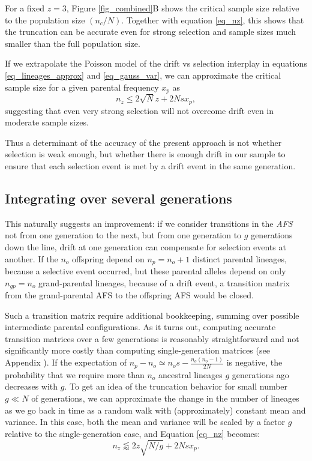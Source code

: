 \documentclass[9pt,twocolumn,twoside,lineno]{gsajnl}
\begin{document}
 For a fixed $z=3$, Figure \ref{fig_combined}B shows the critical sample size relative to the population size
 $(n_c/N)$. Together with equation \ref{eq_nz}, this shows
that the truncation can be accurate even for strong selection and sample sizes much smaller than
the full population size.

If we extrapolate the Poisson model of the drift vs selection interplay in equations \eqref{eq_lineages_approx} and \eqref{eq_gauss_var},
we can approximate the critical sample size for a given parental frequency $x_p$ as
\begin{equation*}
  n_z \leq 2 \sqrt{N} z + 2Nsx_p,
\end{equation*}
suggesting that even very strong selection will not overcome drift even in moderate sample sizes. 

Thus a determinant of the accuracy of the present approach is not whether selection
is weak enough, but whether there is enough drift in our sample to ensure that each 
selection event is met by a drift event in the same generation. 

\subsection{Integrating over several generations}
This naturally suggests an improvement: if we consider transitions in the 
\textit{AFS}  not from one generation to the next, but from one generation to $g$ generations down the line, drift at one generation can compensate for selection events at another.  If the $n_o$ offspring depend on $n_p=n_o+1$ distinct parental lineages, because a selective event occurred, but these parental alleles depend on only $n_{gp} = n_o$ grand-parental lineages, because of a drift event, a transition matrix from the grand-parental AFS to the offspring AFS would be closed.   

Such a transition matrix require additional bookkeeping, summing over possible intermediate parental configurations. As it turns out, computing accurate transition matrices over a few generations is reasonably straightforward and not significantly more costly than computing single-generation matrices
(see Appendix ). If the expectation of $n_p-n_o \simeq n_o  s - \frac{n_o (n_o-1) }{2N}$ is negative, the probability that we require more than $n_o$ ancestral lineages $g$ generations ago decreases with $g.$
To get an idea of the truncation behavior
for small number $g \ll N$ of generations, we can approximate the change  in the number
of lineages as we go back in time as a random walk with (approximately) constant mean and
variance. In this case, both the mean and variance will be scaled by a factor $g$ relative
to the single-generation case, and Equation \eqref{eq_nz} becomes:
\begin{equation}
  n_z \lessapprox 2 z\sqrt{N/g} + 2N s x_p.
\label{eq_nzg}
\end{equation}
\end{document}
